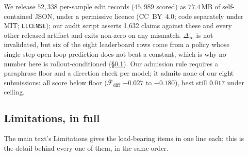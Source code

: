 We release $52{,}338$ per-sample edit records ($45{,}989$ scored) as $77.4$\,MB of self-contained JSON, under a permissive licence (CC~BY~4.0; code separately under MIT; \texttt{LICENSE}); our audit script asserts 1,632 claims against these and every other released artifact and exits non-zero on any mismatch. $\Delta_\infty$ is not invalidated, but six of the eight leaderboard rows come from a policy whose single-step open-loop prediction does not beat a constant, which is why no number here is rollout-conditioned (\S\ref{sec:limitations_full}). Our admission rule requires a paraphrase floor and a direction check per model; it admits none of our eight submissions: all score below floor ($\bar{\mathcal{F}}_{\text{diff}}$ $-0.027$ to $-0.180$), best still $0.017$ under ceiling.

\subsection{Limitations, in full}
\label{sec:limitations_full}

The main text's Limitations gives the load-bearing items in one line each; this is the detail behind every one of them, in the same order.

